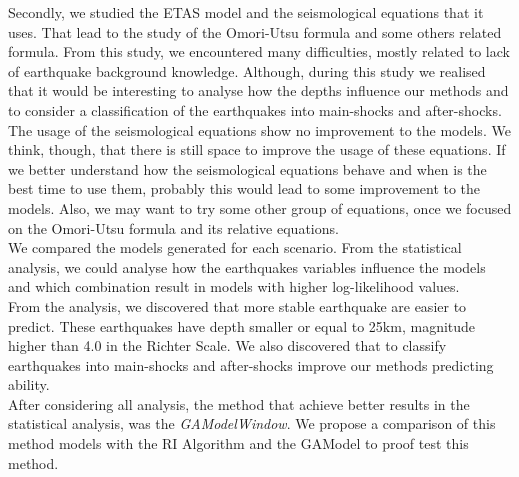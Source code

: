 Secondly, we studied the ETAS model and the seismological equations that it uses. That lead to the study of the Omori-Utsu formula and some others related formula. From this study, we encountered many difficulties, mostly related to lack of earthquake background knowledge. Although, during this study we realised that it would be interesting to analyse how the depths influence our methods and to consider a classification of the earthquakes into main-shocks and after-shocks. \\

The usage of the seismological equations show no improvement to the models. We think, though, that there is still space to improve the usage of these equations. If we better understand how the seismological equations behave and when is the best time to use them, probably this would lead to some improvement to the models. Also, we may want to try some other group of equations, once we focused on the Omori-Utsu formula and its relative equations.\\

We compared the models generated for each scenario. From the statistical analysis, we could analyse how the earthquakes variables influence the models and which combination result in models with higher log-likelihood values.\\

From the analysis, we discovered that more stable earthquake are easier to predict. These earthquakes have depth smaller or equal to 25km, magnitude higher than 4.0 in the Richter Scale. We also discovered that to classify earthquakes into main-shocks and after-shocks improve our methods predicting ability.\\

After considering all analysis, the method that achieve better results in the statistical analysis, was the \textit{GAModelWindow}. We propose a comparison of this method models with the RI Algorithm and the GAModel to proof test this method.\\


%
